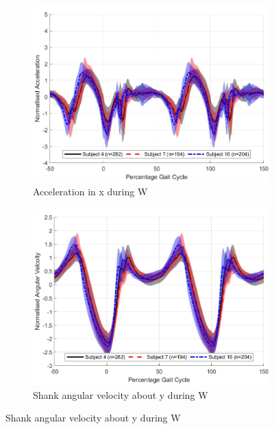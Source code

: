\documentclass[sensors,article,submit,moreauthors,pdftex]{Definitions/mdpi}
\begin{document}
\begin{figure}[!htb]
     \centering
     \begin{subfigure}[b]{0.49\textwidth}
         \centering
         \includegraphics[width=\textwidth]{Figures/inter_subject_trends/accel_x_trend_Walking.jpg}
         \caption{Acceleration in x during W}
         \label{subfig:x_accel_w}
     \end{subfigure}
     \hfill
     \begin{subfigure}[b]{0.49\textwidth}
         \centering
         \includegraphics[width=\textwidth]{Figures/inter_subject_trends/gyro_y_trend_Walking.jpg}
         \caption{Shank angular velocity about y during W}
         \label{subfig:y_gyro_w}
     \end{subfigure}

\end{figure}
\end{document}
